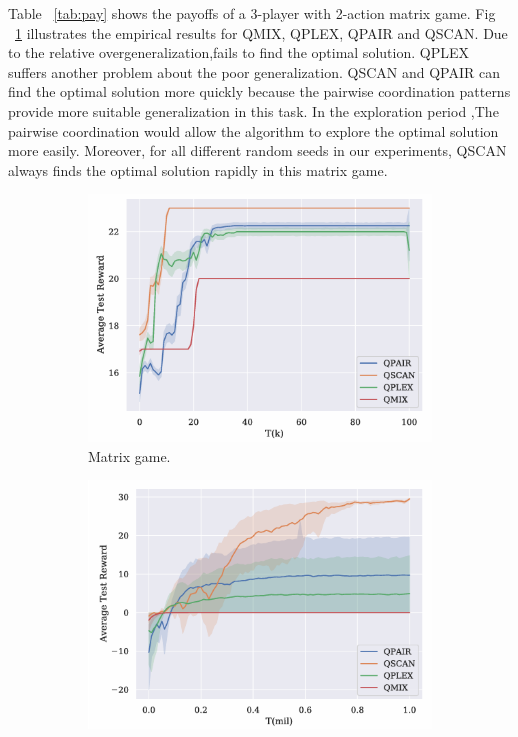     Table ~\ref{tab:pay} shows the payoffs of a 3-player with 2-action matrix game. Fig ~\ref{fig:sub_learning_a} illustrates the empirical results for QMIX, QPLEX, QPAIR and QSCAN. Due to the relative overgeneralization,fails to find the optimal solution. QPLEX suffers another problem about the poor generalization. QSCAN and QPAIR can find the optimal solution more quickly because the pairwise coordination patterns provide more suitable generalization in this task. In the exploration period ,The pairwise coordination would allow the algorithm to explore the optimal solution more easily. Moreover, for all different random seeds in our experiments, QSCAN always finds the optimal solution rapidly in this matrix game.



    \begin{figure}[htbp]
        \centering
        \begin{subfigure}[b]{0.3\textwidth}
            \centering
            \includegraphics[width=\textwidth]{images/ima1.png}
            \caption{Matrix game.}
            \label{fig:sub_learning_a}
        \end{subfigure}
        \hfill
        \begin{subfigure}[b]{0.3\textwidth}
            \centering
            \includegraphics[width=\textwidth]{images/ima2.png}

\end{subfigure}
\end{figure}
